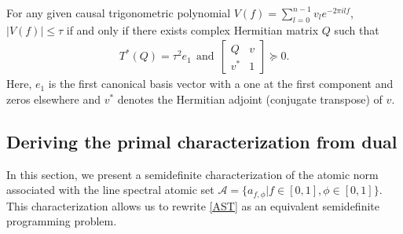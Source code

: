 \begin{lemma}\cite[Theorem 4.24]{brl2007}\label{lm:brl} For any given causal trigonometric polynomial $V(f) = \sum_{l=0}^{n-1} v_l
e^{-2\pi i l f}$, $|V(f)| \leq \tau $ if and only if there exists complex
Hermitian matrix $Q$ such that
\begin{align*}
T^*(Q) = \tau^2 {e}_1~~\mbox{and}~~
\begin{bmatrix}
  Q & v \\
  v^* & 1
 \end{bmatrix} \succeq 0.
\end{align*}
Here, ${e}_1$ is the first canonical basis vector with a one at the first
component and zeros elsewhere and $v^*$ denotes the Hermitian adjoint
(conjugate transpose) of $v$.
\end{lemma}

\subsection{Deriving the primal characterization from dual}
\label{sec:sdp-ast}

In this section, we present a semidefinite characterization of the atomic norm
associated with the line spectral atomic set $\mathcal{A} = \{a_{f,\phi} | f
\in [0, 1], \phi \in [0, 1]\}$. This characterization allows us to rewrite
 {\eqref{AST}} as an equivalent semidefinite programming problem.



